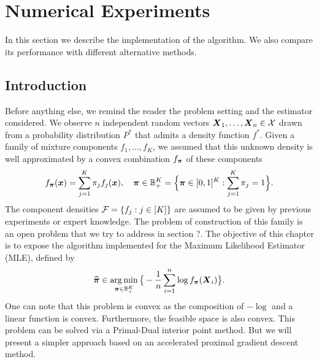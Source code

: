 
\chapter{Numerical Experiments}

In this section we describe the implementation of the algorithm. We also compare its performance with different alternative methods.

\section{Introduction}
Before anything else, we remind the reader the problem setting and the estimator considered. We observe $n$ independent random vectors $\boldsymbol X_1,\ldots,\boldsymbol X_n\in\mathcal X$ drawn from a probability distribution $P^*$ that admits a density function $f^*$. Given a family of mixture components $f_1,\ldots,f_K$, we assumed that this unknown density is well approximated by a convex combination $f_{\boldsymbol \pi}$ of these components
\begin{equation}
f_{\boldsymbol \pi}(\boldsymbol x)=\sum_{j=1}^K\pi_j f_j(\boldsymbol x), \quad \boldsymbol \pi \in {\mathbb B}_+^K=\Big\{\boldsymbol \pi\in [0,1]^K: \sum_{j=1}^K\pi_j=1\Big\}.
\end{equation}
The component densities $\mathcal F=\{f_j:j\in[K]\}$ are assumed to be given by previous experiments or expert knowledge. The problem of construction of this family is an open problem that we try to address in section ?. The objective of this chapter is to expose the algorithm implemented for the Maximum Likelihood Estimator (MLE), defined by
\begin{equation}
\label{MLE_2}
\widehat{\boldsymbol \pi} \in \operatorname*{arg\,min}_{\boldsymbol \pi\in {\mathbb B}_+^K}\big\{-\frac{1}{n}\sum_{i=1}^n\log f_{\boldsymbol \pi}(\boldsymbol X_i)\big\}.
\end{equation}
One can note that this problem is convex as the composition of $-\log$ and a linear function is convex. Furthermore, the feasible space is also convex. This problem can be solved via a Primal-Dual interior point method. But we will present a simpler approach based on an accelerated proximal gradient descent method.
